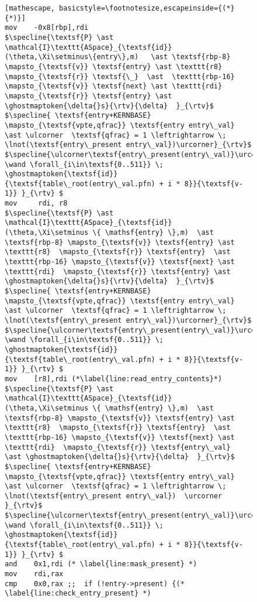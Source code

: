 \begin{figure}
\begin{lstlisting}[mathescape, basicstyle=\footnotesize,escapeinside={(*}{*)}]
mov    -0x8[rbp],rdi
$\specline{\textsf{P} \ast \mathcal{I}\texttt{ASpace}_{\textsf{id}}(\theta,\Xi\setminus\{entry\},m)   \ast \textsf{rbp-8} \mapsto_{\textsf{v}} \textsf{entry} \ast \texttt{r8}  \mapsto_{\textsf{r}} \textsf{\_}  \ast  \texttt{rbp-16} \mapsto_{\textsf{v}} \textsf{next} \ast \texttt{rdi}  \mapsto_{\textsf{r}} \textsf{entry} \ast \ghostmaptoken{\delta{}s}{\rtv}{\delta}  }_{\rtv}$
$\specline{ \textsf{entry+KERNBASE} \mapsto_{\textsf{vpte,qfrac}} \textsf{entry entry\_val} \ast \ulcorner  \textsf{qfrac} = 1 \leftrightarrow \; \lnot(\textsf{entry\_present entry\_val})\urcorner}_{\rtv}$
$\specline{\ulcorner\textsf{entry\_present(entry\_val)}\urcorner \wand \forall_{i\in\textsf{0..511}} \; \ghostmaptoken{\textsf{id}}{\textsf{table\_root(entry\_val.pfn) + i * 8}}{\textsf{v-1}} }_{\rtv} $
mov     rdi, r8
$\specline{\textsf{P} \ast \mathcal{I}\texttt{ASpace}_{\textsf{id}}(\theta,\Xi\setminus \{ \mathsf{entry} \},m)  \ast \textsf{rbp-8} \mapsto_{\textsf{v}} \textsf{entry} \ast \texttt{r8}  \mapsto_{\textsf{r}} \textsf{entry}  \ast  \texttt{rbp-16} \mapsto_{\textsf{v}} \textsf{next} \ast \texttt{rdi}  \mapsto_{\textsf{r}} \textsf{entry} \ast \ghostmaptoken{\delta{}s}{\rtv}{\delta}  }_{\rtv}$
$\specline{ \textsf{entry+KERNBASE} \mapsto_{\textsf{vpte,qfrac}} \textsf{entry entry\_val} \ast \ulcorner  \textsf{qfrac} = 1 \leftrightarrow \; \lnot(\textsf{entry\_present entry\_val})\urcorner}_{\rtv}$
$\specline{\ulcorner\textsf{entry\_present(entry\_val)}\urcorner \wand \forall_{i\in\textsf{0..511}} \; \ghostmaptoken{\textsf{id}}{\textsf{table\_root(entry\_val.pfn) + i * 8}}{\textsf{v-1}} }_{\rtv} $
mov    [r8],rdi (*\label{line:read_entry_contents}*)
$\specline{\textsf{P} \ast \mathcal{I}\texttt{ASpace}_{\textsf{id}}(\theta,\Xi\setminus \{ \mathsf{entry} \},m)  \ast \textsf{rbp-8} \mapsto_{\textsf{v}} \textsf{entry} \ast \texttt{r8}  \mapsto_{\textsf{r}} \textsf{entry}  \ast  \texttt{rbp-16} \mapsto_{\textsf{v}} \textsf{next} \ast \texttt{rdi}  \mapsto_{\textsf{r}} \textsf{entry\_val}  \ast \ghostmaptoken{\delta{}s}{\rtv}{\delta}  }_{\rtv}$
$\specline{ \textsf{entry+KERNBASE} \mapsto_{\textsf{vpte,qfrac}} \textsf{entry entry\_val} \ast \ulcorner  \textsf{qfrac} = 1 \leftrightarrow \; \lnot(\textsf{entry\_present entry\_val})  \urcorner }_{\rtv}$
$\specline{\ulcorner\textsf{entry\_present(entry\_val)}\urcorner \wand \forall_{i\in\textsf{0..511}} \; \ghostmaptoken{\textsf{id}}{\textsf{table\_root(entry\_val.pfn) + i * 8}}{\textsf{v-1}} }_{\rtv} $
and    0x1,rdi (* \label{line:mask_present} *)
mov    rdi,rax
cmp    0x0,rax ;;  if (!entry->present) {(* \label{line:check_entry_present} *)

\end{lstlisting}
\end{figure}
